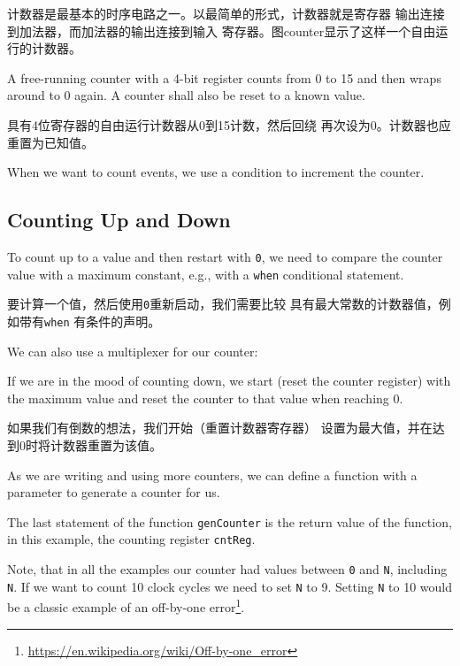 \documentclass[%
    10pt,
    headinclude, footexclude,
    openright, %
    notitlepage,
    cleardoubleempty,
    headsepline,
    pointlessnumbers,
    bibtotoc, idxtotoc,
    ]{scrbook}
\newcommand{\code}[1]{{\small{\texttt{#1}}}}
\newcommand{\myref}[2]{\href{#1}{#2}}
\renewcommand{\myref}[2]{{#2}{\footnote{\url{#1}}}}
\begin{document}
计数器是最基本的时序电路之一。以最简单的形式，计数器就是寄存器
输出连接到加法器，而加法器的输出连接到输入
寄存器。图counter显示了这样一个自由运行的计数器。

A free-running counter with a 4-bit register counts from 0 to 15 and then wraps around
to 0 again. A counter shall also be reset to a known value.

具有4位寄存器的自由运行计数器从0到15计数，然后回绕
再次设为0。计数器也应重置为已知值。


\noindent When we want to count events, we use a condition to  increment the counter.


\subsection{Counting Up and Down}

To count up to a value and then restart with \code{0}, we need to compare
the counter value with a maximum constant, e.g., with a \code{when}
conditional statement.

要计算一个值，然后使用\code{0}重新启动，我们需要比较
具有最大常数的计数器值，例如带有\code{when}
有条件的声明。


\noindent We can also use a multiplexer for our counter:


\noindent If we are in the mood of counting down, we start (reset the counter register)
with the maximum value and reset the counter to that value when reaching 0.


如果我们有倒数的想法，我们开始（重置计数器寄存器）
设置为最大值，并在达到0时将计数器重置为该值。


\noindent As we are writing and using more counters, we can
define a function with a parameter to generate a counter for us.


\noindent The last statement of the function \code{genCounter} is the return
value of the function, in this example, the counting register \code{cntReg}.

Note, that in all the examples our counter had values between \code{0} and
\code{N}, including \code{N}. If we want to count 10 clock cycles we need
to set \code{N} to 9. Setting \code{N} to 10 would be a classic example of an
\myref{https://en.wikipedia.org/wiki/Off-by-one_error}{off-by-one error}.
\end{document}
